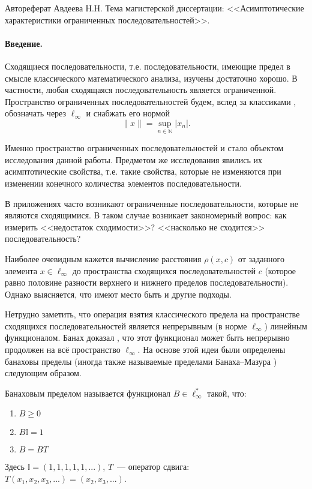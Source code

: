 \documentclass[a4paper,openbib]{report}
\begin{document}

Автореферат Авдеева Н.Н.
Тема магистерской диссертации: <<Асимптотические характеристики ограниченных последовательностей>>.


\paragraph{Введение.}
Сходящиеся последовательности, т.е. последовательности, имеющие предел в смысле классического математического анализа,
изучены достаточно хорошо.
В частности, любая сходящаяся последовательность является ограниченной.
Пространство ограниченных последовательностей будем, вслед за классиками \cite{wojtaszczyk1996banach,lindenstrauss1973classical},
обозначать через $\ell_\infty$ и снабжать его нормой
\begin{equation*}
	\|x\| = \sup_{n\in\mathbb{N}}|x_n|
	.
\end{equation*}

Именно пространство ограниченных последовательностей и стало объектом исследования данной работы.
Предметом же исследования явились их асимптотические свойства, т.е. такие свойства,
которые не изменяются при изменении конечного количества элементов последовательности.

В приложениях часто возникают ограниченные последовательности,
которые не являются сходящимися.
В таком случае возникает закономерный вопрос:
как измерить <<недостаток сходимости>>?
<<насколько не сходится>> последовательность?

Наиболее очевидным кажется вычисление расстояния $\rho(x,c)$ от заданного элемента $x\in\ell_\infty$
до пространства сходящихся последовательностей $c$
(которое равно половине разности верхнего и нижнего пределов последовательности).
Однако выясняется, что имеют место быть и другие подходы.

Нетрудно заметить, что операция взятия классического предела на пространстве сходящихся последовательностей
является непрерывным (в норме $\ell_\infty$) линейным функционалом.
Банах доказал \cite{banach1993theorie}, что этот функционал может быть непрерывно продолжен на всё пространство $\ell_\infty$.
На основе этой идеи были определены банаховы пределы
(иногда также называемые пределами Банаха--Мазура \cite{alekhno2012superposition,alekhno2015banach})
следующим образом.

Банаховым пределом называется функционал $B\in \ell_\infty^*$ такой, что:
\begin{enumerate}
	\item
		$B \geqslant 0$
	\item
		$B\mathbb{I} = 1$
	\item
		$B=BT$
\end{enumerate}
Здесь $\mathbb{I}=(1,1,1,1,1,...)$,
$T$~--- оператор сдвига: $T(x_1, x_2, x_3, ...) = (x_2, x_3, ...)$.
\end{document}
